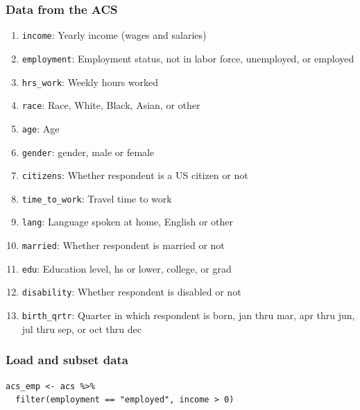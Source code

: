 \documentclass[11pt,containsverbatim,handout,xcolor=xelatex,dvipsnames,table]{beamer}
\begin{document}
\begin{frame}
\frametitle{Data from the ACS}

{\scriptsize
\begin{enumerate}
\item \texttt{income}: Yearly income (wages and salaries)
\item \texttt{employment}: Employment status, not in labor force, unemployed, or employed
\item \texttt{hrs\_work}: Weekly hours worked
\item \texttt{race}: Race, White, Black, Asian, or other
\item \texttt{age}: Age
\item \texttt{gender}: gender, male or female
\item \texttt{citizens}: Whether respondent is a US citizen or not
\item \texttt{time\_to\_work}: Travel time to work
\item \texttt{lang}: Language spoken at home, English or other
\item \texttt{married}: Whether respondent is married or not
\item \texttt{edu}: Education level, hs or lower, college, or grad
\item \texttt{disability}: Whether respondent is disabled or not
\item \texttt{birth\_qrtr}: Quarter in which respondent is born, jan thru mar, apr thru jun, jul thru sep, or oct thru dec 
\end{enumerate}
}

\end{frame}


\begin{frame}[fragile]
\frametitle{Load and subset data}

{\footnotesize
\begin{Verbatim}[frame=single, formatcom=\color{blue}]
acs_emp <- acs %>%
  filter(employment == "employed", income > 0)
\end{Verbatim}
}

\end{frame}

\end{document}
